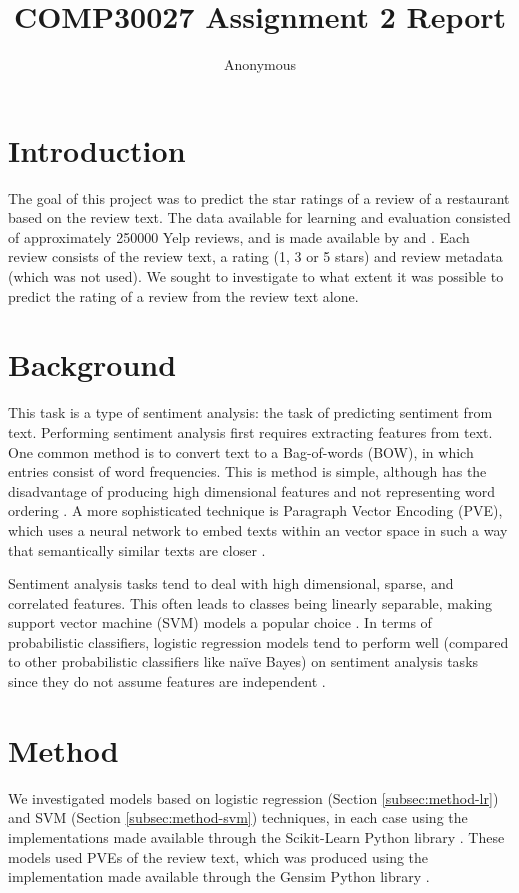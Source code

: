 \documentclass[11pt]{article}
\title{COMP30027 Assignment 2 Report}
\author
{Anonymous}
\begin{document}
\maketitle

\section{Introduction}
The goal of this project was to predict the star ratings of a review of a restaurant based on the review text. The data available for learning and evaluation consisted of approximately 250000 Yelp reviews, and is made available by \cite{medhat_sentiment_2014} and \cite{rayana_collective_2015}. Each review consists of the review text, a rating (1, 3 or 5 stars) and review metadata (which was not used). We sought to investigate to what extent it was possible to predict the rating of a review from the review text alone. 

\section{Background}
This task is a type of sentiment analysis: the task of predicting sentiment from text. Performing sentiment analysis first requires extracting features from text. One common method is to convert text to a Bag-of-words (BOW), in which entries consist of word frequencies. This is method is simple, although has the disadvantage of producing high dimensional features and not representing word ordering \cite{le_distributed_2014}. A more sophisticated technique is Paragraph Vector Encoding (PVE), which uses a neural network to embed texts within an vector space in such a way that semantically similar texts are closer \cite{le_distributed_2014}.

Sentiment analysis tasks tend to deal with high dimensional, sparse, and correlated features. This often leads to classes being linearly separable, making support vector machine (SVM) models a popular choice \cite{medhat_sentiment_2014}. In terms of probabilistic classifiers, logistic regression models tend to perform well (compared to other probabilistic classifiers like na\"{i}ve Bayes) on sentiment analysis tasks since they do not assume features are independent \cite{medhat_sentiment_2014}.

\section{Method} \label{sec:method}
We investigated models based on logistic regression (Section \ref{subsec:method-lr}) and SVM (Section \ref{subsec:method-svm}) techniques, in each case using the implementations made available through the Scikit-Learn Python library \cite{sklearn_pedregosa_scikit-learn_2011}. These models used PVEs of the review text, which was produced using the implementation made available through the Gensim Python library \cite{gensim_rehurek_software_2010}. 
\end{document}
